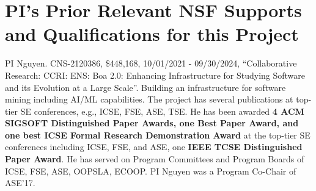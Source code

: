 \section{PI's Prior Relevant NSF Supports and Qualifications for this Project}
\label{prior}


PI Nguyen. CNS-2120386, \$448,168, 10/01/2021 - 09/30/2024,
``Collaborative Research: CCRI: ENS: Boa 2.0: Enhancing Infrastructure
for Studying Software and its Evolution at a Large Scale''.
 Building an infrastructure for
software mining including AI/ML capabilities.
  The project has several publications
at top-tier SE conferences, e.g., ICSE, FSE, ASE, TSE.  He has been
awarded {\bf 4 ACM SIGSOFT Distinguished Paper Awards, one Best Paper
  Award, and one best ICSE Formal Research Demonstration Award} at the
top-tier SE conferences including ICSE, FSE, and ASE, one {\bf IEEE
  TCSE Distinguished Paper Award}. He has served on Program Committees
and Program Boards of ICSE, FSE, ASE, OOPSLA, ECOOP. PI Nguyen was a
Program Co-Chair of ASE'17.








